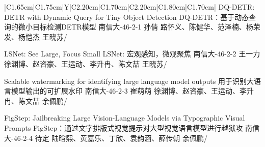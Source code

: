 \Needspace{7.5cm}
\begin{tabularx}{\textwidth}{|C{1.65cm}|C{1.75cm}|Y|C{2.20cm}|C{1.70cm}|C{2.20cm}|C{1.80cm}|C{1.70cm}|}
\HeaderRow
{}
{DQ-DETR: DETR with Dynamic Query for Tiny Object Detection  \newline  DQ‑DETR：基于动态查询的微小目标检测DETR模型}
{南信大-46-2-1}
{孙倩}
{路怀义、陈健华、范泽楠、杨荣发、杨恺杰}
{王晓苏}{/}


{LSNet: See Large, Focus Small  \newline 
LSNet: 宏观感知，微观聚焦}
{南信大-46-2-2}
{王一力}
{徐渊博、赵咨豪、王运动、李升冉、陈文喆}
{王晓苏}{/}




{Scalable watermarking for identifying large language model outputs \newline  用于识别大语言模型输出的可扩展水印 }
{南信大-46-2-3}
{崔萌萌}
{徐渊博、赵咨豪、王运动、李升冉、陈文喆}
{余佩鹏}{/}

{FigStep: Jailbreaking Large Vision-Language Models via Typographic Visual Prompts  \newline   FigStep：通过文字排版式视觉提示对大型视觉语言模型进行越狱攻}
{南信大-46-2-4}
{待定}
{陆晗熙、黄嘉乐、丁欣、袁韵涵、薛传朝}
{余佩鹏}{/}
\end{tabularx}
\BlockGap


